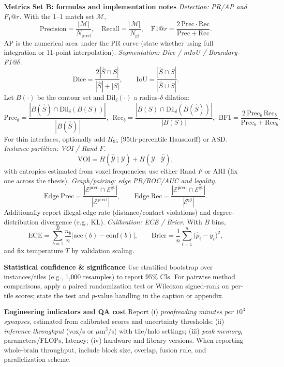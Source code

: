 \medskip
\noindent\textbf{Metrics Set B: formulas and implementation notes}\;
\emph{Detection: PR/AP and \(F_1@r\).} With the 1--1 match set \(\mathcal M\),
\[
\mathrm{Precision}=\frac{|\mathcal M|}{N_{\mathrm{pred}}},\quad
\mathrm{Recall}=\frac{|\mathcal M|}{N_{\mathrm{gt}}},\quad
\mathrm{F1@}r=\frac{2\,\mathrm{Prec}\cdot\mathrm{Rec}}{\mathrm{Prec}+\mathrm{Rec}}.
\]
AP is the numerical area under the PR curve (state whether using full integration or 11-point interpolation).  
\emph{Segmentation: Dice / mIoU / Boundary-F1@\(\delta\).}
\[
\mathrm{Dice}=\frac{2|\hat S\cap S|}{|\hat S|+|S|},\qquad
\mathrm{IoU}=\frac{|\hat S\cap S|}{|\hat S\cup S|}.
\]
Let \(B(\cdot)\) be the contour set and \(\mathrm{Dil}_\delta(\cdot)\) a radius-\(\delta\) dilation:
\[
\mathrm{Prec}_b=\frac{|B(\hat S)\cap \mathrm{Dil}_\delta(B(S))|}{|B(\hat S)|},\ \ 
\mathrm{Rec}_b=\frac{|B(S)\cap \mathrm{Dil}_\delta(B(\hat S))|}{|B(S)|},\ \ 
\mathrm{BF1}=\frac{2\,\mathrm{Prec}_b\,\mathrm{Rec}_b}{\mathrm{Prec}_b+\mathrm{Rec}_b}.
\]
For thin interfaces, optionally add \(H_{95}\) (95th-percentile Hausdorff) or ASD.  
\emph{Instance partition: VOI / Rand \(F\).}
\[
\mathrm{VOI}=H(\hat{\mathcal Y}\mid\mathcal Y)+H(\mathcal Y\mid\hat{\mathcal Y}),
\]
with entropies estimated from voxel frequencies; use either Rand \(F\) or ARI (fix one across the thesis).  
\emph{Graph/pairing: edge PR/ROC/AUC and legality.}
\[
\mathrm{Edge\;Prec}=\frac{|\mathcal E^{\mathrm{pred}}\cap \mathcal E^{\mathrm{gt}}|}{|\mathcal E^{\mathrm{pred}}|},\qquad
\mathrm{Edge\;Rec}=\frac{|\mathcal E^{\mathrm{pred}}\cap \mathcal E^{\mathrm{gt}}|}{|\mathcal E^{\mathrm{gt}}|}.
\]
Additionally report illegal-edge rate (distance/contact violations) and degree-distribution divergence (e.g., KL).  
\emph{Calibration: ECE / Brier.} With \(B\) bins,
\[
\mathrm{ECE}=\sum_{b=1}^{B}\frac{n_b}{n}\bigl|\mathrm{acc}(b)-\mathrm{conf}(b)\bigr|,\qquad
\mathrm{Brier}=\frac{1}{n}\sum_{i=1}^n\bigl(\hat p_i-y_i\bigr)^2,
\]
and fix temperature \(T\) by validation scaling.

\medskip
\noindent\textbf{Statistical confidence \& significance}\;
Use stratified bootstrap over instances/tiles (e.g., 1{,}000 resamples) to report 95\% CIs.
For pairwise method comparisons, apply a paired randomization test or Wilcoxon signed-rank on per-tile scores; state the test and \(p\)-value handling in the caption or appendix.

\medskip
\noindent\textbf{Engineering indicators and QA cost}\;
Report (i) \emph{proofreading minutes per \(10^3\) synapses}, estimated from calibrated scores and uncertainty thresholds; (ii) \emph{inference throughput} (vox/s or \(\mu\mathrm{m}^3\)/s) with tile/halo settings; (iii) \emph{peak memory}, parameters/FLOPs, latency; (iv) hardware and library versions. When reporting whole-brain throughput, include block size, overlap, fusion rule, and parallelization scheme.

